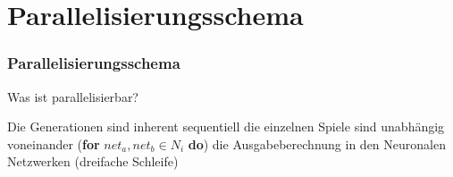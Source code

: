 \section{Parallelisierungsschema}

\begin{frame}
    \frametitle{Parallelisierungsschema}

    Was ist parallelisierbar?
    \begin{itemize}
        \con
            Die Generationen sind inherent sequentiell
        \pro
            die einzelnen Spiele sind unabhängig voneinander
            (\textbf{for} $net_a, net_b \in N_i$ \textbf{do})
        \unknown
            die Ausgabeberechnung in den Neuronalen Netzwerken
            (dreifache Schleife)
    \end{itemize}
\end{frame}

